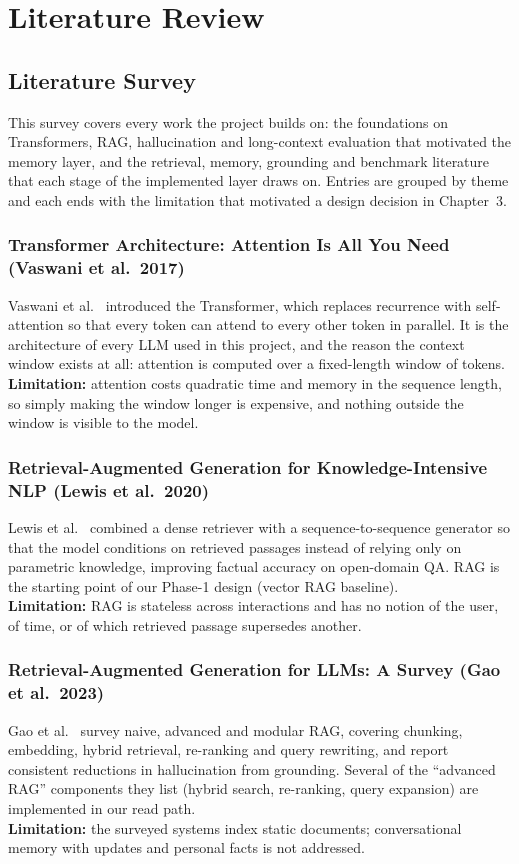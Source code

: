 \chapter{Literature Review}

\section{Literature Survey}
This survey covers every work the project builds on: the foundations on Transformers, RAG, hallucination
and long-context evaluation that motivated the memory layer, and the retrieval, memory, grounding and
benchmark literature that each stage of the implemented layer draws on. Entries are grouped by theme and
each ends with the limitation that motivated a design decision in Chapter~3.

\subsection{Transformer Architecture: Attention Is All You Need (Vaswani et al.\ 2017)}
Vaswani et al.\ \cite{vaswani2017} introduced the Transformer, which replaces recurrence with
self-attention so that every token can attend to every other token in parallel. It is the architecture
of every LLM used in this project, and the reason the context window exists at all: attention is computed
over a fixed-length window of tokens. \\
\textbf{Limitation:} attention costs quadratic time and memory in the sequence length, so simply making
the window longer is expensive, and nothing outside the window is visible to the model.

\subsection{Retrieval-Augmented Generation for Knowledge-Intensive NLP (Lewis et al.\ 2020)}
Lewis et al.\ \cite{lewis2020} combined a dense retriever with a sequence-to-sequence generator so that
the model conditions on retrieved passages instead of relying only on parametric knowledge, improving
factual accuracy on open-domain QA. RAG is the starting point of our Phase-1 design (vector RAG baseline). \\
\textbf{Limitation:} RAG is stateless across interactions and has no notion of the user, of time, or of
which retrieved passage supersedes another.

\subsection{Retrieval-Augmented Generation for LLMs: A Survey (Gao et al.\ 2023)}
Gao et al.\ \cite{gao2023} survey naive, advanced and modular RAG, covering chunking, embedding, hybrid
retrieval, re-ranking and query rewriting, and report consistent reductions in hallucination from
grounding. Several of the ``advanced RAG'' components they list (hybrid search, re-ranking, query
expansion) are implemented in our read path. \\
\textbf{Limitation:} the surveyed systems index static documents; conversational memory with updates and
personal facts is not addressed.

